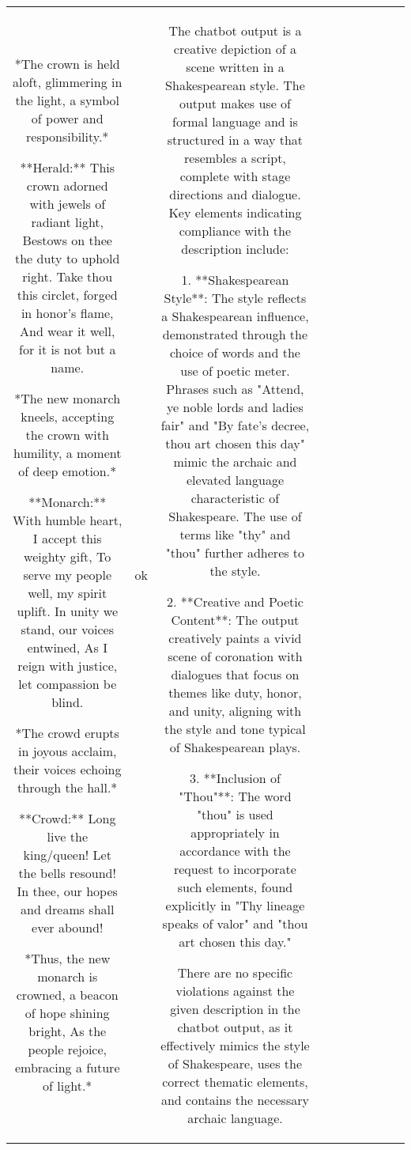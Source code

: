 \begin{table}[h!]
\begin{tabular}{|c|c|c|c|c|c|c|c|c|c|}
*The crown is held aloft, glimmering in the light, a symbol of power and responsibility.*

**Herald:**  
This crown adorned with jewels of radiant light,  
Bestows on thee the duty to uphold right.  
Take thou this circlet, forged in honor’s flame,  
And wear it well, for it is not but a name.  

*The new monarch kneels, accepting the crown with humility, a moment of deep emotion.*

**Monarch:**  
With humble heart, I accept this weighty gift,  
To serve my people well, my spirit uplift.  
In unity we stand, our voices entwined,  
As I reign with justice, let compassion be blind.  

*The crowd erupts in joyous acclaim, their voices echoing through the hall.*

**Crowd:**  
Long live the king/queen! Let the bells resound!  
In thee, our hopes and dreams shall ever abound!  

*Thus, the new monarch is crowned, a beacon of hope shining bright,  
As the people rejoice, embracing a future of light.* & ok & The chatbot output is a creative depiction of a scene written in a Shakespearean style. The output makes use of formal language and is structured in a way that resembles a script, complete with stage directions and dialogue. Key elements indicating compliance with the description include:

1. **Shakespearean Style**: The style reflects a Shakespearean influence, demonstrated through the choice of words and the use of poetic meter. Phrases such as "Attend, ye noble lords and ladies fair" and "By fate’s decree, thou art chosen this day" mimic the archaic and elevated language characteristic of Shakespeare. The use of terms like "thy" and "thou" further adheres to the style.

2. **Creative and Poetic Content**: The output creatively paints a vivid scene of coronation with dialogues that focus on themes like duty, honor, and unity, aligning with the style and tone typical of Shakespearean plays.

3. **Inclusion of "Thou"**: The word "thou" is used appropriately in accordance with the request to incorporate such elements, found explicitly in "Thy lineage speaks of valor" and "thou art chosen this day."

There are no specific violations against the given description in the chatbot output, as it effectively mimics the style of Shakespeare, uses the correct thematic elements, and contains the necessary archaic language.


\end{tabular}
\end{table}
